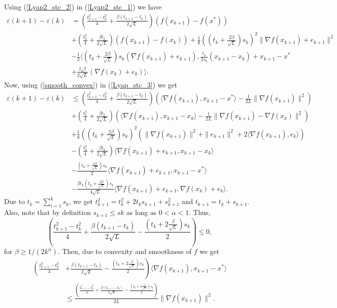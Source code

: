 \documentclass{article}
\theoremstyle{plain}
\theoremstyle{definition}
\theoremstyle{remark}
\begin{document}
    Using (\ref{Lyap2_stc_2}) in (\ref{Lyap2_stc_1}) we have
    \begin{align}\label{Lyap_stc_3}
        \varepsilon(k+1)-\varepsilon(k)&=(\frac{t_{k+1}^2-t_k^2}{4}+\frac{\beta(t_{k+1}-t_k)}{2\sqrt{L}})(f(x_{k+1})-f(x^*))\nonumber\\
        &+(\frac{t_{k}^2}{4}+\frac{\beta t_{k}}{2\sqrt{L}})(f(x_{k+1})-f(x_k))+\frac{1}{8}((t_k+\frac{2\beta}{\sqrt{L}})s_k)^2\|\nabla f(x_{k+1})+e_{k+1}\|^2\nonumber\\
        &-\frac{1}{2}\langle (t_k+\frac{2\beta}{\sqrt{L}})s_k (\nabla f(x_{k+1})+e_{k+1}), \frac{t_k}{2s_k}(x_{k+1}-x_k)+x_{k+1}-x^*\nonumber\\
        &+\frac{t_k\beta}{2\sqrt{L}}(\nabla f(x_k)+e_k)\rangle.
    \end{align}
    Now, using (\ref{smooth_convex}) in (\ref{Lyap_stc_3}) we get
    \begin{align}\label{Lyap2_stc_4}
         \varepsilon(k+1)-\varepsilon(k)&\leq (\frac{t_{k+1}^2-t_k^2}{4}+\frac{\beta(t_{k+1}-t_k)}{2\sqrt{L}})(\langle \nabla f(x_{k+1}),x_{k+1}-x^* \rangle-\frac{1}{2L}\|\nabla f(x_{k+1})\|^2)\nonumber\\
         & +(\frac{t_{k}^2}{4}+\frac{\beta t_{k}}{2\sqrt{L}})(\langle \nabla f(x_{k+1}),x_{k+1}-x_k \rangle-\frac{1}{2L}\|\nabla f(x_{k+1})-\nabla f(x_k)\|^2)\nonumber\\
         & +\frac{1}{8}((t_k+\frac{2\beta}{\sqrt{L}})s_k)^2(\|\nabla f(x_{k+1})\|^2+\|e_{k+1}\|^2+2\langle \nabla f(x_{k+1}) ,e_k \rangle) \nonumber\\
         & -(\frac{t_k^2}{4}+\frac{\beta t_k}{2\sqrt{L}})\langle \nabla f(x_{k+1})+e_{k+1},x_{k+1}-x_k\rangle\nonumber\\
         &-\frac{(t_k+\tfrac{2\beta}{\sqrt{L}})s_k}{2}\langle \nabla f(x_{k+1})+e_{k+1},x_{k+1}-x^*\rangle\nonumber\\
         & -\frac{\beta t_k(t_k+\frac{2\beta}{\sqrt{L}})s_k}{4\sqrt{L}}\langle \nabla f(x_{k+1})+e_{k+1}, \nabla f(x_k)+e_k \rangle.
         \end{align}
          Due to $t_k=\sum_{i=1}^k s_k$, we get $t_{k+1}^2=t_k^2 + 2t_ks_{k+1}+ s_{k+1}^2$ and $t_{k+1}=t_k+s_{k+1}$. Also, note  that by definition $s_{k+1}\leq s{k}$ as long as $0<\alpha<1$. Thus,
         $$\left(\frac{t_{k+1}^2-t_k^2}{4}+\frac{\beta (t_{k+1}-t_k)}{2\sqrt{L}} -\frac{(t_k+2\frac{\beta}{\sqrt{L}})s_k}{2}\right)\leq 0,$$
         for $\beta \geq 1/(2k^\alpha)$.
         Then, due to convexity and smoothness of $f$ we get
         \begin{align}\label{Lyap2_stc_5}
             \left(\frac{t_{k+1}^2-t_k^2}{4}\right. & \left. +\frac{\beta (t_{k+1}-t_k)}{2\sqrt{L}} -\frac{(t_k+2\frac{\beta}{\sqrt{L}})s_k}{2}\right)\langle \nabla f(x_{k+1}), x_{k+1}-x^* \rangle\nonumber\\
             &\leq \frac{\left(\frac{t_{k+1}^2-t_k^2}{4}+\frac{\beta (t_{k+1}-t_k)}{2\sqrt{L}} -\frac{(t_k+2\frac{\beta}{\sqrt{L}})s_k}{2}\right)}{2L}\|\nabla f(x_{k+1})\|^2.
         \end{align} 
\end{document}
